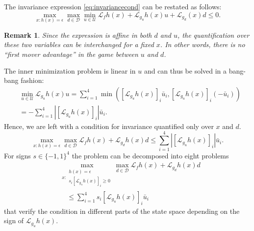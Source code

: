 \documentclass[conference]{IEEEtran}
\newtheorem{remark}{Remark}
\begin{document}
The invariance expression \eqref{eq:invariancecond} can be restated as follows:
\begin{equation}
  \max_{x : h(x) = \epsilon} \max_{d \in \mathcal D} \min_{u \in \mathcal U} \mathcal L_f h(x) + \mathcal L_{g_u} h(x) u + \mathcal L_{g_d}(x) d \leq 0.
\end{equation}
\begin{remark}
  Since the expression is affine in both $d$ and $u$, the quantification over these two variables can be interchanged for a fixed $x$. In other words, there is no ``first mover advantage'' in the game between $u$ and $d$.
\end{remark}
The inner minimization problem is linear in $u$ and can thus be solved in a bang-bang fashion:
\begin{equation*}
\begin{aligned}
    & \min_{u \in \mathcal U} \mathcal L_{g_u} h(x) u = \sum_{i=1}^4 \min \left([\mathcal L_{g_u} h(x)]_i \bar u_i, [\mathcal L_{g_u} h(x)]_i (- \bar u_i) \right) \\
    & = - \sum_{i=1}^4 \left| [\mathcal L_{g_u} h(x)]_i \right|  \bar u_i.
\end{aligned}
\end{equation*} 
Hence, we are left with a condition for invariance quantified only over $x$ and $d$.
\begin{equation}
  \max_{x : h(x) = \epsilon} \max_{d \in \mathcal D} \mathcal L_f h (x) + \mathcal L_{g_d} h (x) d \leq \sum_{i=1}^4 \left| \left[ \mathcal L_{g_u} h(x) \right]_i \right|  \bar u_i.
\end{equation}
For signs $s \in \{ -1,1 \}^4$ the problem can be decomposed into eight problems
\begin{equation}
\begin{aligned}
  & \max_{x : \substack{h(x) = \epsilon \\ s_i \left[ \mathcal  L_{g_u} h(x) \right]_i \geq 0 }} \max_{d \in \mathcal D} \mathcal L_f h (x) + \mathcal L_{g_d} h (x) d \\
  & \quad \leq \sum_{i=1}^4 s_i \left[ \mathcal L_{g_u} h(x) \right]_i \bar u_i
\end{aligned}
\end{equation}
that verify the condition in different parts of the state space depending on the sign of $\mathcal L_{g_u} h(x)$.
\end{document}
